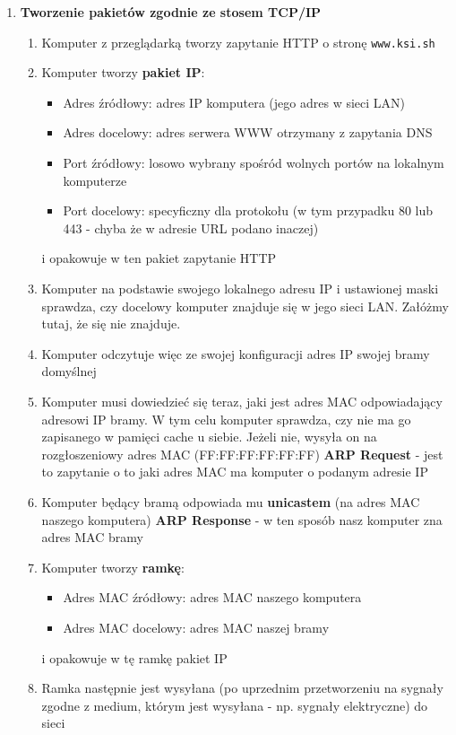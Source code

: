 \documentclass[main.tex]{subfiles}
\begin{document}
\begin{enumerate}
        \item \textbf{Tworzenie pakietów zgodnie ze stosem TCP/IP}
        \begin{enumerate}
            \item Komputer z przeglądarką tworzy zapytanie HTTP o stronę \texttt{www.ksi.sh}
            \item Komputer tworzy \textbf{pakiet IP}:
            \begin{itemize}
                \item Adres źródłowy: adres IP komputera (jego adres w sieci LAN)
                \item Adres docelowy: adres serwera WWW otrzymany z zapytania DNS
                \item Port źródłowy: losowo wybrany spośród wolnych portów na lokalnym komputerze
                \item Port docelowy: specyficzny dla protokołu (w tym przypadku 80 lub 443 - chyba że w adresie URL podano inaczej)
            \end{itemize}
            i opakowuje w ten pakiet zapytanie HTTP
            \item Komputer na podstawie swojego lokalnego adresu IP i ustawionej maski sprawdza, czy docelowy komputer znajduje się w jego sieci LAN.
            Załóżmy tutaj, że się nie znajduje.
            \item Komputer odczytuje więc ze swojej konfiguracji adres IP swojej bramy domyślnej
            \item Komputer musi dowiedzieć się teraz, jaki jest adres MAC odpowiadający adresowi IP bramy.
            W tym celu komputer sprawdza, czy nie ma go zapisanego w pamięci cache u siebie.
            Jeżeli nie, wysyła on na rozgłoszeniowy adres MAC (FF:FF:FF:FF:FF:FF) \textbf{ARP Request} - jest to zapytanie o to jaki adres MAC ma komputer o podanym adresie IP
            \item Komputer będący bramą odpowiada mu \textbf{unicastem} (na adres MAC naszego komputera) \textbf{ARP Response} - w ten sposób nasz komputer zna adres MAC bramy
            \item Komputer tworzy \textbf{ramkę}:
            \begin{itemize}
                \item Adres MAC źródłowy: adres MAC naszego komputera
                \item Adres MAC docelowy: adres MAC naszej bramy
            \end{itemize}
            i opakowuje w tę ramkę pakiet IP
            \item Ramka następnie jest wysyłana (po uprzednim przetworzeniu na sygnały zgodne z medium, którym jest wysyłana - np. sygnały elektryczne) do sieci
        \end{enumerate}


\end{enumerate}
\end{document}
